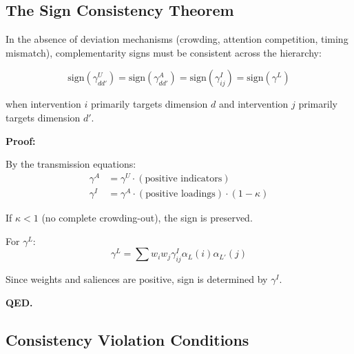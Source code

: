 \subsection{The Sign Consistency Theorem}

\begin{theorem}
\label{thm:gtc-sign}

In the absence of deviation mechanisms (crowding, attention competition, timing
mismatch), complementarity signs must be consistent across the hierarchy:

\begin{equation}
\boxed{
\text{sign}(\gamma^U_{dd'}) = \text{sign}(\gamma^A_{dd'}) = \text{sign}(\gamma^I_{ij}) = \text{sign}(\gamma^L)
}
\end{equation}

when intervention $i$ primarily targets dimension $d$ and intervention $j$
primarily targets dimension $d'$.

\textbf{Proof:}

By the transmission equations:
\begin{align}
\gamma^A &= \gamma^U \cdot (\text{positive indicators}) \\
\gamma^I &= \gamma^A \cdot (\text{positive loadings}) \cdot (1 - \kappa)
\end{align}

If $\kappa < 1$ (no complete crowding-out), the sign is preserved.

For $\gamma^L$:
\begin{equation}
\gamma^L = \sum w_i w_j \gamma^I_{ij} \alpha_L(i) \alpha_{L'}(j)
\end{equation}

Since weights and saliences are positive, sign is determined by $\gamma^I$.

\textbf{QED.}
\end{theorem}

\subsection{Consistency Violation Conditions}

